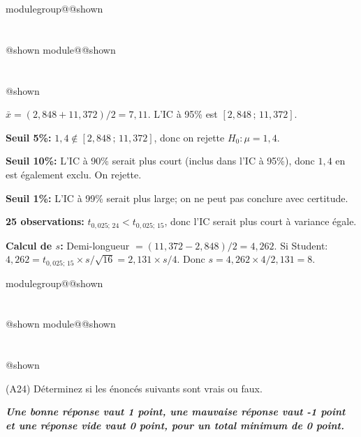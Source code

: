 \documentclass{Evaluation}
\makeatletter
\newcommand{\currentmodulekey}{}
\newcommand{\currentmoduletitle}{}
\newcommand{\currentgroupkey}{}
\newcommand{\currentgrouptitle}{}
\newcommand{\showmoduleifneeded}{%
  \ifx\currentgroupkey\empty\else
    \expandafter\ifx\csname modulegroup@\currentgroupkey @shown\endcsname\relax
      \section*{\currentgrouptitle}%
      \expandafter\gdef\csname modulegroup@\currentgroupkey @shown\endcsname{1}%
    \fi
  \fi
  \expandafter\ifx\csname module@\currentmodulekey @shown\endcsname\relax
    \section*{\currentmoduletitle}%
    \expandafter\gdef\csname module@\currentmodulekey @shown\endcsname{1}%
  \fi
}
\newenvironment{H24}{\showmoduleifneeded}{}
\newenvironment{A24}{\showmoduleifneeded}{}
\makeatother
\begin{document}
\begin{questions}
\begin{H24}
\begin{solution}
$\bar{x} = (2{,}848 + 11{,}372)/2 = 7{,}11$. L'IC à 95\% est $[2{,}848\,;\,11{,}372]$.

\textbf{Seuil 5\%:} $1{,}4 \notin [2{,}848\,;\,11{,}372]$, donc on rejette $H_0: \mu = 1{,}4$.

\textbf{Seuil 10\%:} L'IC à 90\% serait plus court (inclus dans l'IC à 95\%), donc $1{,}4$ en est également exclu. On rejette.

\textbf{Seuil 1\%:} L'IC à 99\% serait plus large; on ne peut pas conclure avec certitude.

\textbf{25 observations:} $t_{0{,}025;\,24} < t_{0{,}025;\,15}$, donc l'IC serait plus court à variance égale.

\textbf{Calcul de $s$:} Demi-longueur $= (11{,}372 - 2{,}848)/2 = 4{,}262$. Si Student: $4{,}262 = t_{0{,}025;\,15} \times s/\sqrt{16} = 2{,}131 \times s/4$. Donc $s = 4{,}262 \times 4 / 2{,}131 = 8$.
\end{solution}
\end{H24}

\begin{A24}
\question (A24)
Déterminez si les énoncés suivants sont vrais ou faux.

\textbf{\textit{Une bonne réponse vaut 1 point, une mauvaise réponse vaut -1 point et une réponse vide vaut 0 point, pour un total minimum de 0 point.}}

\end{A24}
\end{questions}
\end{document}
